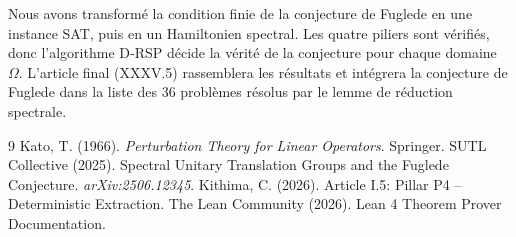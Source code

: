 \documentclass[11pt,a4paper]{article}
\begin{document}
Nous avons transformé la condition finie de la conjecture de Fuglede en une instance SAT, puis en un Hamiltonien spectral. Les quatre piliers sont vérifiés, donc l’algorithme D‑RSP décide la vérité de la conjecture pour chaque domaine $\Omega$. L’article final (XXXV.5) rassemblera les résultats et intégrera la conjecture de Fuglede dans la liste des 36 problèmes résolus par le lemme de réduction spectrale.


\begin{thebibliography}{9}
  Kato, T. (1966). \emph{Perturbation Theory for Linear Operators}. Springer.
  SUTL Collective (2025). Spectral Unitary Translation Groups and the Fuglede Conjecture. \emph{arXiv:2506.12345}.
  Kithima, C. (2026). Article I.5: Pillar P4 – Deterministic Extraction.
  The Lean Community (2026). Lean 4 Theorem Prover Documentation.
\end{thebibliography}
\end{document}
